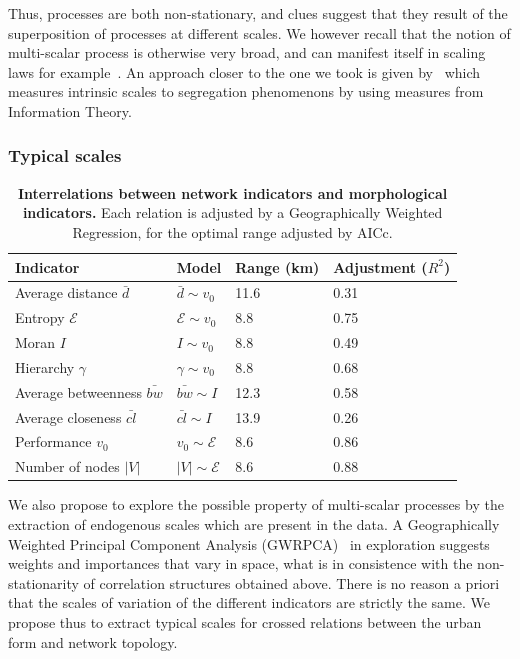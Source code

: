 \documentclass[11pt]{article}
\begin{document}
Thus, processes are both non-stationary, and clues suggest that they result of the superposition of processes at different scales. We however recall that the notion of multi-scalar process is otherwise very broad, and can manifest itself in scaling laws for example~\cite{west2017scale}. An approach closer to the one we took is given by~\cite{Chodrow31102017} which measures intrinsic scales to segregation phenomenons by using measures from Information Theory.





\subsubsection{Typical scales}

\begin{table}[h!]
\caption{\textbf{Interrelations between network indicators and morphological indicators.} Each relation is adjusted by a Geographically Weighted Regression, for the optimal range adjusted by AICc.\label{tab:staticcorrelations:gwr}}
\begin{center}
\begin{tabular}{|l|l|l|l|}
\hline
Indicator & Model & Range (km) & Adjustment ($R^2$) \\ \hline
Average distance $\bar{d}$ & $\bar{d} \sim v_0$ & 11.6 & 0.31 \\
Entropy $\mathcal{E}$  & $\mathcal{E} \sim v_0$ &  8.8  &0.75 \\
Moran $I$ & $I \sim v_0$ & 8.8 & 0.49 \\
Hierarchy $\gamma$ & $\gamma \sim v_0$ & 8.8  & 0.68 \\\hline
Average betweenness $\bar{bw}$ & $\bar{bw} \sim I$ & 12.3 & 0.58 \\
Average closeness $\bar{cl}$ & $\bar{cl}\sim I$ & 13.9 & 0.26 \\
Performance $v_0$ & $v_0 \sim \mathcal{E}$ & 8.6  & 0.86 \\
Number of nodes $\left|V\right|$ & $\left|V\right| \sim \mathcal{E}$ & 8.6  & 0.88 \\\hline
\end{tabular}
\end{center}
\end{table}


We also propose to explore the possible property of multi-scalar processes by the extraction of endogenous scales which are present in the data. A Geographically Weighted Principal Component Analysis (GWRPCA)~\cite{harris2011geographically} in exploration suggests weights and importances that vary in space, what is in consistence with the non-stationarity of correlation structures obtained above. There is no reason a priori that the scales of variation of the different indicators are strictly the same. We propose thus to extract typical scales for crossed relations between the urban form and network topology.
\end{document}
